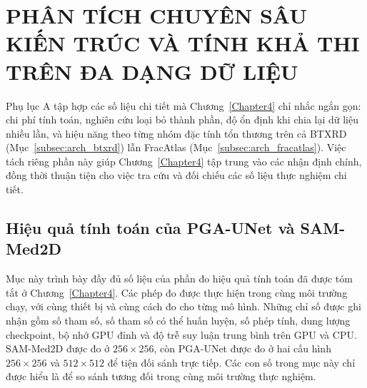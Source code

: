 \chapter{PHÂN TÍCH CHUYÊN SÂU KIẾN TRÚC VÀ TÍNH KHẢ THI TRÊN ĐA DẠNG DỮ LIỆU}
\label{AppendixA}

Phụ lục A tập hợp các số liệu chi tiết mà Chương~\ref{Chapter4} chỉ nhắc ngắn gọn: chi phí tính toán, nghiên cứu loại bỏ thành phần, độ ổn định khi chia lại dữ liệu nhiều lần, và hiệu năng theo từng nhóm đặc tính tổn thương trên cả BTXRD (Mục~\ref{subsec:arch_btxrd}) lẫn FracAtlas (Mục~\ref{subsec:arch_fracatlas}). Việc tách riêng phần này giúp Chương~\ref{Chapter4} tập trung vào các nhận định chính, đồng thời thuận tiện cho việc tra cứu và đối chiếu các số liệu thực nghiệm chi tiết.

\section{Hiệu quả tính toán của PGA-UNet và SAM-Med2D}
\label{sec:appendix_efficiency}

Mục này trình bày đầy đủ số liệu của phần đo hiệu quả tính toán đã được tóm tắt ở Chương~\ref{Chapter4}. Các phép đo được thực hiện trong cùng môi trường chạy, với cùng thiết bị và cùng cách đo cho từng mô hình. Những chỉ số được ghi nhận gồm số tham số, số tham số có thể huấn luyện, số phép tính, dung lượng checkpoint, bộ nhớ GPU đỉnh và độ trễ suy luận trung bình trên GPU và CPU. SAM-Med2D được đo ở $256\times256$, còn PGA-UNet được đo ở hai cấu hình $256\times256$ và $512\times512$ để tiện đối sánh trực tiếp. Các con số trong mục này chỉ được hiểu là để so sánh tương đối trong cùng môi trường thực nghiệm.

